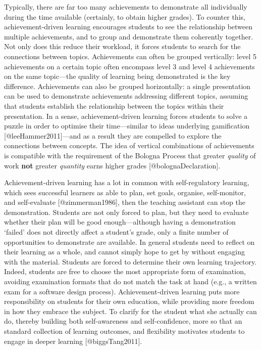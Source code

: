 \documentclass[
]{article}
\begin{document}
Typically, there are far too many achievements to demonstrate all
individually during the time available (certainly, to obtain higher
grades). To counter this, achievement-driven learning encourages
students to see the relationship between multiple achievements, and to
group and demonstrate them coherently together. Not only does this
reduce their workload, it forces students to search for the connections
between topics. Achievements can often be grouped vertically: level 5
achievements on a certain topic often encompass level 3 and level 4
achievements on the same topic---the quality of learning being
demonstrated is the key difference. Achievements can also be grouped
horizontally: a single presentation can be used to demonstrate
achievements addressing different topics, assuming that students
establish the relationship between the topics within their presentation.
In a sense, achievement-driven learning forces students to solve a
puzzle in order to optimise their time---similar to ideas underlying
gamification {[}@leeHammer2011{]}---and as a result they are compelled
to explore the connections between concepts. The idea of vertical
combinations of achievements is compatible with the requirement of the
Bologna Process that greater \textit{quality} of work \textbf{not}
greater \textit{quantity} earns higher grades {[}@bolognaDeclaration{]}.

Achievement-driven learning has a lot in common with self-regulatory
learning, which sees successful learners as able to plan, set goals,
organise, self-monitor, and self-evaluate {[}@zimmerman1986{]}, then the
teaching assistant can stop the demonstration. Students are not only
forced to plan, but they need to evaluate whether their plan will be
good enough---although having a demonstration `failed' does not directly
affect a student's grade, only a finite number of opportunities to
demonstrate are available. In general students need to reflect on their
learning as a whole, and cannot simply hope to get by without engaging
with the material. Students are forced to determine their own learning
trajectory. Indeed, students are free to choose the most appropriate
form of examination, avoiding examination formats that do not match the
task at hand (e.g., a written exam for a software design process).
Achievement-driven learning puts more responsibility on students for
their own education, while providing more freedom in how they embrace
the subject. To clarify for the student what she actually can do,
thereby building both self-awareness and self-confidence, more so that
an standard collection of learning outcomes, and flexibility motivates
students to engage in deeper learning {[}@biggsTang2011{]}.
\end{document}
